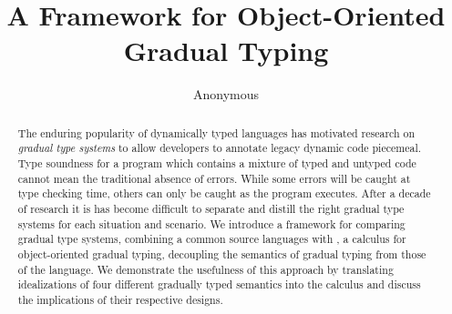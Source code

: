 \documentclass[a4paper,USenglish]{tex/lipics-v2016}
\begin{document}
\title{A Framework for Object-Oriented Gradual Typing}
\author{Anonymous}


\EventLogo{}


\maketitle

\begin{abstract} 
The enduring popularity of dynamically typed languages has
motivated research on \emph{gradual type systems} to allow developers to
annotate legacy dynamic code piecemeal. Type soundness for a program which
contains a mixture of typed and untyped code cannot mean the traditional
absence of errors. While some errors will be caught at type checking time,
others can only be caught as the program executes. After a decade of research
it is has become difficult to separate and distill the right gradual type
systems for each situation and scenario. We introduce a framework for
comparing gradual type systems, combining a common source languages with
\kafka, a calculus for object-oriented gradual typing, decoupling the
semantics of gradual typing from those of the language. We demonstrate the
usefulness of this approach by translating idealizations of four different
gradually typed semantics into the calculus and discuss the implications of
their respective designs. 
\end{abstract}
\end{document}
